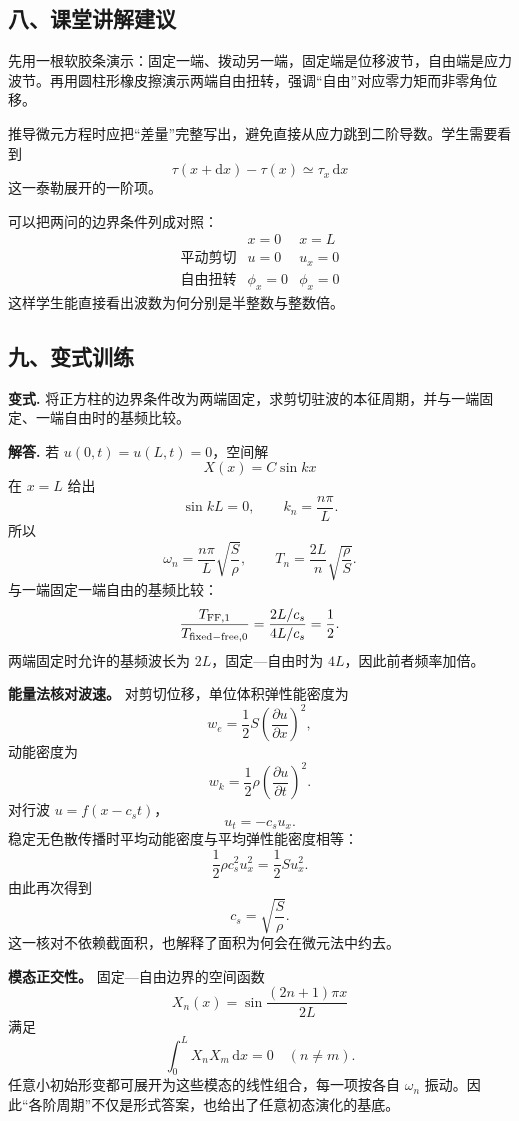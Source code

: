 \documentclass[12pt,a4paper,UTF8]{ctexart}
\begin{document}
\subsection{八、课堂讲解建议}\label{ux516bux8bfeux5802ux8bb2ux89e3ux5efaux8bae-2}

先用一根软胶条演示：固定一端、拨动另一端，固定端是位移波节，自由端是应力波节。再用圆柱形橡皮擦演示两端自由扭转，强调``自由''对应零力矩而非零角位移。

推导微元方程时应把``差量''完整写出，避免直接从应力跳到二阶导数。学生需要看到
\[
\tau(x+\mathrm dx)-\tau(x)
\simeq\tau_x\,\mathrm dx
\] 这一泰勒展开的一阶项。

可以把两问的边界条件列成对照： \[
\begin{array}{c|c|c}
&x=0&x=L\\ \hline
\text{平动剪切}&u=0&u_x=0\\
\text{自由扭转}&\phi_x=0&\phi_x=0
\end{array}
\] 这样学生能直接看出波数为何分别是半整数与整数倍。

\subsection{九、变式训练}\label{ux4e5dux53d8ux5f0fux8badux7ec3-2}

\textbf{变式.}
将正方柱的边界条件改为两端固定，求剪切驻波的本征周期，并与一端固定、一端自由时的基频比较。

\textbf{解答.} 若 \(u(0,t)=u(L,t)=0\)，空间解 \[
X(x)=C\sin kx
\] 在 \(x=L\) 给出 \[
\sin kL=0,\qquad k_n=\frac{n\pi}{L}.
\] 所以 \[
\omega_n=\frac{n\pi}{L}\sqrt{\frac S\rho},
\qquad
\boxed{
T_n=\frac{2L}{n}\sqrt{\frac\rho S}
}.
\] 与一端固定一端自由的基频比较： \[
\frac{T_{\rm FF,1}}{T_{\rm fixed-free,0}}
=\frac{2L/c_s}{4L/c_s}
=\frac12.
\] 两端固定时允许的基频波长为 \(2L\)，固定---自由时为
\(4L\)，因此前者频率加倍。

\textbf{能量法核对波速。} 对剪切位移，单位体积弹性能密度为 \[
w_e=\frac12S\left(\frac{\partial u}{\partial x}\right)^2,
\] 动能密度为 \[
w_k=\frac12\rho\left(\frac{\partial u}{\partial t}\right)^2.
\] 对行波 \(u=f(x-c_st)\)， \[
u_t=-c_su_x.
\] 稳定无色散传播时平均动能密度与平均弹性能密度相等： \[
\frac12\rho c_s^2u_x^2
=\frac12Su_x^2.
\] 由此再次得到 \[
c_s=\sqrt{\frac S\rho}.
\] 这一核对不依赖截面积，也解释了面积为何会在微元法中约去。

\textbf{模态正交性。} 固定---自由边界的空间函数 \[
X_n(x)=\sin\frac{(2n+1)\pi x}{2L}
\] 满足 \[
\int_0^LX_nX_m\,\mathrm dx=0
\quad(n\ne m).
\] 任意小初始形变都可展开为这些模态的线性组合，每一项按各自 \(\omega_n\)
振动。因此``各阶周期''不仅是形式答案，也给出了任意初态演化的基底。
\end{document}
